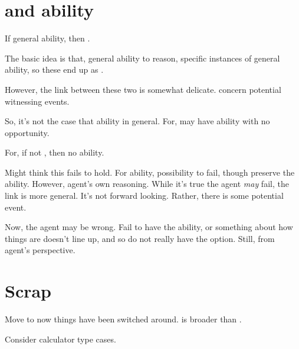 \section{ and ability}
\label{sec:fc3-ability}

\begin{note}
  If general ability, then .

  The basic idea is that, general ability to reason, specific instances of general ability, so these end up as .

  However, the link between these two is somewhat delicate.
   concern potential witnessing events.

  So, it's not the case that ability in general.
  For, may have ability with no opportunity.

  For, if not \fc{}, then no ability.

  Might think this fails to hold.
  For ability, possibility to fail, though preserve the ability.
  However, agent's own reasoning.
  While it's true the agent \emph{may} fail, the link is more general.
  It's not forward looking.
  Rather, there is some potential event.

  Now, the agent may be wrong.
  Fail to have the ability, or something about how things are doesn't line up, and so do not really have the option.
  Still, from agent's perspective.
\end{note}

\section{Scrap}

\begin{note}
  {
    \color{red}
    Move to \requ{} now things have been switched around.
  }
  \fc{} is broader than \requ{}.

  Consider calculator type cases.
\end{note}



